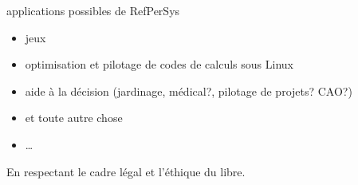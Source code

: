 \documentclass[final,a4,xcolor={svgnames,dvipsnames}]{beamer}
\begin{document}
 \begin{frame}{applications possibles de RefPerSys}

   \begin{itemize}
   \item jeux
   \item optimisation et pilotage de codes de calculs sous Linux
   \item aide à la décision (jardinage, médical?, pilotage de projets?
     CAO?)
   \item et toute autre chose
   \item \ldots
   \end{itemize}

   En respectant le cadre légal et l'éthique du libre.
 \end{frame}
 
\end{document}
